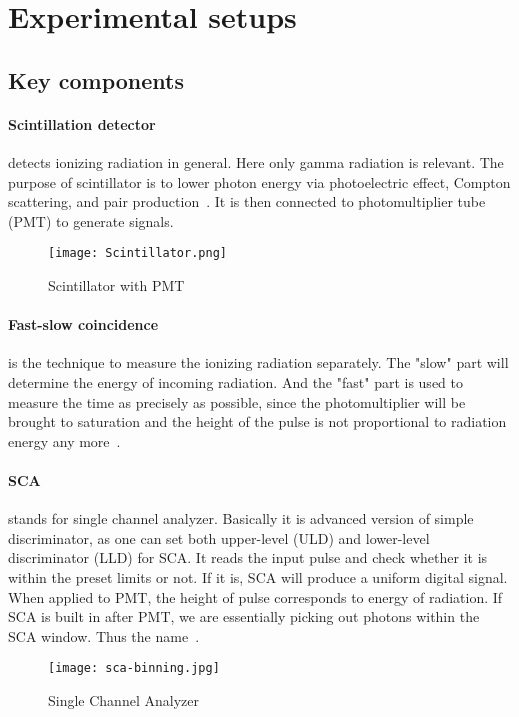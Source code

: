 \section{Experimental setups}\label{sec:setup}

\subsection{Key components}
\paragraph{Scintillation detector}
detects ionizing radiation in general. Here only gamma radiation is relevant. The purpose of scintillator is to lower photon energy via photoelectric effect, Compton scattering, and pair production~\cite{wermes}. It is then connected to photomultiplier tube (PMT) to generate signals.
\begin{figure}[ht]
   \centering
   \texttt{[image: Scintillator.png]}
   \caption{Scintillator with PMT~\cite{wikiScin}}%
\end{figure}


\paragraph{Fast-slow coincidence} is the technique to measure the ionizing radiation separately. The "slow" part will determine the energy of incoming radiation. And the "fast" part is used to measure the time as precisely as possible, since the photomultiplier will be brought to saturation and the height of the pulse is not proportional to radiation energy any more~\cite{IACI1968103}. 

\paragraph{SCA} stands for single channel analyzer. Basically it is advanced version of simple discriminator, as one can set both upper-level (ULD) and lower-level discriminator (LLD) for SCA. It reads the input pulse and check whether it is within the preset limits or not. If it is, SCA will produce a uniform digital signal.
When applied to PMT, the height of pulse corresponds to energy of radiation. If SCA is built in after PMT, we are essentially picking out photons within the SCA window. Thus the name~\cite{SCAmanual}.

\begin{figure}[ht]
	\centering
	\texttt{[image: sca-binning.jpg]}
	\caption{Single Channel Analyzer~\cite{wikiScin}}%
\end{figure}


